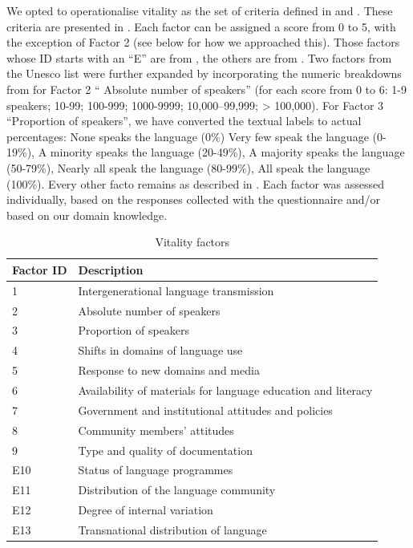\documentclass[a4paper,11pt]{article}
\begin{document}
We opted to operationalise vitality as the set of criteria defined in \citet{unesco2003} and \citet{unesco2011}. These criteria are presented in . Each factor can be assigned a score from 0 to 5, with the exception of Factor 2 (see below for how we approached this). Those factors whose ID starts with an ``E'' are from \citet{unesco2011}, the others are from \citet{unesco2003}. Two factors from the Unesco list were further expanded by incorporating the numeric breakdowns from \cite{lee2016} for Factor 2 `` Absolute number of speakers'' (for each score from 0 to 6: 1-9 speakers; 10-99; 100-999; 1000-9999; 10,000–99,999; > 100,000). For Factor 3 ``Proportion of speakers'', we have converted the textual labels to actual percentages: None speaks the language (0\%)	Very few speak the language (0-19\%), A minority speaks the language (20-49\%), A majority speaks the language (50-79\%), Nearly all speak the language (80-99\%), All speak the language (100\%). Every other facto remains as described in \citet{unesco2003, unesco2011}. Each factor was assessed individually, based on the responses collected with the questionnaire and/or based on our domain knowledge.

\begin{table}
\caption{Vitality factors}
\label{tab:vit-facs}
\centering
\begin{tabular}{@{}ll@{}}
\toprule
Factor ID & Description                                                   \\ \midrule
1         & Intergenerational language transmission                       \\
2         & Absolute number of speakers                                   \\
3         & Proportion of speakers                                        \\
4         & Shifts in domains of language use                             \\
5         & Response to new domains and media                             \\
6         & Availability of materials for language education and literacy \\
7         & Government and institutional attitudes and policies           \\
8         & Community members' attitudes                                  \\
9         & Type and quality of documentation                             \\ \midrule
E10       & Status of language programmes                                 \\
E11       & Distribution of the language community                        \\
E12       & Degree of internal variation                                  \\
E13       & Transnational distribution of language                        \\ \bottomrule
\end{tabular}
\end{table}
\end{document}
